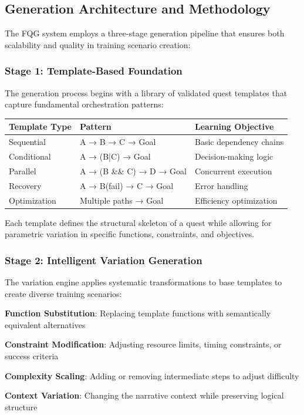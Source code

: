 \subsection*{Generation Architecture and Methodology}

The FQG system employs a three-stage generation pipeline that ensures both scalability and quality in training scenario creation:

\subsubsection*{Stage 1: Template-Based Foundation}

The generation process begins with a library of validated quest templates that capture fundamental orchestration patterns:

\begin{center}
\begin{tabular}{@{}lll@{}}
\toprule
\textbf{Template Type} & \textbf{Pattern} & \textbf{Learning Objective} \\
\midrule
Sequential & A → B → C → Goal & Basic dependency chains \\
Conditional & A → (B|C) → Goal & Decision-making logic \\
Parallel & A → (B \&\& C) → D → Goal & Concurrent execution \\
Recovery & A → B(fail) → C → Goal & Error handling \\
Optimization & Multiple paths → Goal & Efficiency optimization \\
\bottomrule
\end{tabular}
\end{center}

Each template defines the structural skeleton of a quest while allowing for parametric variation in specific functions, constraints, and objectives.

\subsubsection*{Stage 2: Intelligent Variation Generation}

The variation engine applies systematic transformations to base templates to create diverse training scenarios:

\begin{compactlist}
    \item \textbf{Function Substitution}: Replacing template functions with semantically equivalent alternatives
    \item \textbf{Constraint Modification}: Adjusting resource limits, timing constraints, or success criteria
    \item \textbf{Complexity Scaling}: Adding or removing intermediate steps to adjust difficulty
    \item \textbf{Context Variation}: Changing the narrative context while preserving logical structure
\end{compactlist}

